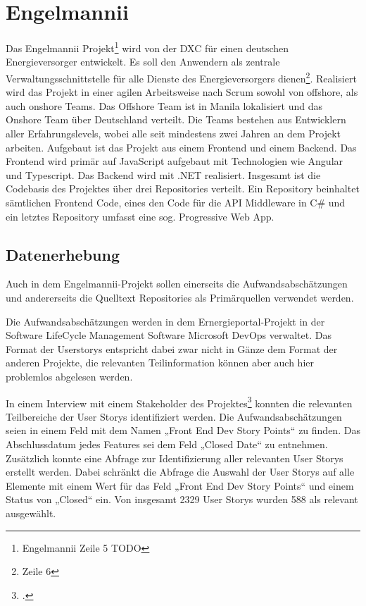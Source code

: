 \section{Engelmannii}\label{engelmannii}

Das Engelmannii Projekt\footnote{Engelmannii Zeile 5 TODO} wird von der
DXC für einen deutschen Energieversorger entwickelt. Es soll den
Anwendern als zentrale Verwaltungsschnittstelle für alle Dienste des
Energieversorgers dienen\footnote{Zeile 6}. Realisiert wird das Projekt
in einer agilen Arbeitsweise nach Scrum sowohl von offshore, als auch
onshore Teams. Das Offshore Team ist in Manila lokalisiert und das
Onshore Team über Deutschland verteilt. Die Teams bestehen aus
Entwicklern aller Erfahrungslevels, wobei alle seit mindestens zwei
Jahren an dem Projekt arbeiten. Aufgebaut ist das Projekt aus einem
Frontend und einem Backend. Das Frontend wird primär auf JavaScript
aufgebaut mit Technologien wie Angular und Typescript. Das Backend wird
mit .NET realisiert. Insgesamt ist die Codebasis des Projektes über drei
Repositories verteilt. Ein Repository beinhaltet sämtlichen Frontend
Code, eines den Code für die \ac{API} Middleware in C\# und ein letztes
Repository umfasst eine sog. Progressive Web App.

\subsection{Datenerhebung}\label{engelmannii-Datenerhebung}

Auch in dem Engelmannii-Projekt sollen einerseits die
Aufwandsabschätzungen und andererseits die Quelltext Repositories als
Primärquellen verwendet werden.

Die Aufwandsabschätzungen werden in dem Ernergieportal-Projekt in der
Software LifeCycle Management Software Microsoft DevOps verwaltet. Das
Format der Userstorys entspricht dabei zwar nicht in Gänze dem Format
der anderen Projekte, die relevanten Teilinformation können aber auch
hier problemlos abgelesen werden.

In einem Interview mit einem Stakeholder des Projektes\footcite[Vgl. ][]{stakeholdernInterviewMitStakeholdern2022}
konnten die relevanten Teilbereiche der User Storys identifiziert
werden. Die Aufwandsabschätzungen seien in einem Feld mit dem Namen
„Front End Dev Story Points`` zu finden. Das Abschlussdatum jedes
Features sei dem Feld „Closed Date`` zu entnehmen. Zusätzlich konnte
eine Abfrage zur Identifizierung aller relevanten User Storys erstellt
werden. Dabei schränkt die Abfrage die Auswahl der User Storys auf alle
Elemente mit einem Wert für das Feld „Front End Dev Story Points`` und
einem Status von „Closed`` ein. Von insgesamt 2329 User Storys wurden
588 als relevant ausgewählt.

